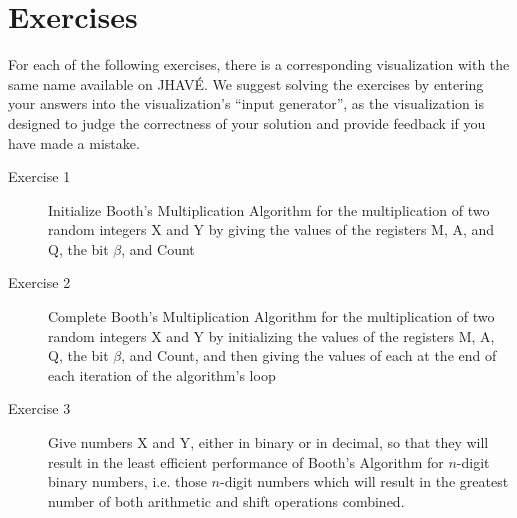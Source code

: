 \documentclass{article}
\begin{document}
\section{Exercises}
For each of the following exercises, there is a corresponding visualization with the same name available on JHAVÉ.
We suggest solving the exercises by entering your answers into the visualization's ``input generator'', as the visualization is designed to judge the correctness of your solution and provide feedback if you have made a mistake.

\begin{description}
    \item [Exercise 1] Initialize Booth's Multiplication Algorithm for the multiplication of two random integers X and Y by giving the values of the registers M, A, and Q, the bit $\beta$, and Count
    \item [Exercise 2] Complete Booth's Multiplication Algorithm for the multiplication of two random integers X and Y by initializing the values of the registers M, A, Q, the bit $\beta$, and Count, and then giving the values of each at the end of each iteration of the algorithm's loop
    \item [Exercise 3] Give numbers X and Y, either in binary or in decimal, so that they will result in the least efficient performance of Booth's Algorithm for $n$-digit binary numbers, i.e. those $n$-digit numbers which will result in the greatest number of both arithmetic and shift operations combined.
\end{description}

\end{document}

